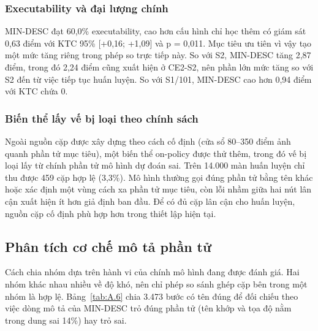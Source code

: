 \subsubsection{Executability và đại lượng chính}\label{sec:A.2.2.2}

MIN-DESC đạt 60,0\% executability, cao hơn cấu hình chỉ học thêm có giám sát 0,63 điểm với KTC 95\% [+0,16; +1,09] và p = 0,011. Mục tiêu ưu tiên vì vậy tạo một mức tăng riêng trong phép so trực tiếp này. So với S2, MIN-DESC tăng 2,87 điểm, trong đó 2,24 điểm cũng xuất hiện ở CE2-S2, nên phần lớn mức tăng so với S2 đến từ việc tiếp tục huấn luyện. So với S1/101, MIN-DESC cao hơn 0,94 điểm với KTC chứa 0.

\subsubsection{Biến thể lấy vế bị loại theo chính sách}\label{sec:A.2.2.3}

Ngoài nguồn cặp được xây dựng theo cách cố định (cửa sổ 80--350 điểm ảnh quanh phần tử mục tiêu), một biến thể on-policy được thử thêm, trong đó vế bị loại lấy từ chính phần tử mô hình dự đoán sai. Trên 14.000 màn huấn luyện chỉ thu được 459 cặp hợp lệ (3,3\%). Mô hình thường gọi đúng phần tử bằng tên khác hoặc xác định một vùng cách xa phần tử mục tiêu, còn lỗi nhầm giữa hai nút lân cận xuất hiện ít hơn giả định ban đầu. Để có đủ cặp lân cận cho huấn luyện, nguồn cặp cố định phù hợp hơn trong thiết lập hiện tại.

\subsection{Phân tích cơ chế mô tả phần tử}\label{sec:A.2.3}

Cách chia nhóm dựa trên hành vi của chính mô hình đang được đánh giá. Hai nhóm khác nhau nhiều về độ khó, nên chỉ phép so sánh ghép cặp bên trong một nhóm là hợp lệ. Bảng~\ref{tab:A.6} chia 3.473 bước có tên đúng để đối chiếu theo việc dòng mô tả của MIN-DESC trỏ đúng phần tử (tên khớp và tọa độ nằm trong dung sai 14\%) hay trỏ sai.

